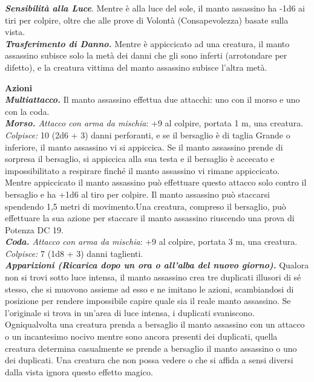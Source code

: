 \begin{multicols}{2}
\emph{\textbf{Sensibilità alla Luce}}. Mentre è alla luce del sole, il manto assassino ha -1d6 ai tiri per colpire, oltre che alle prove di Volontà (Consapevolezza) basate sulla vista.\\

\emph{\textbf{Trasferimento di Danno.}} Mentre è appiccicato ad una creatura, il manto assassino subisce solo la metà dei danni che gli sono inferti (arrotondare per difetto), e la creatura vittima del manto assassino subisce l'altra metà.

\smallskip\textbf{Azioni}\\

\emph{\textbf{Multiattacco.}} Il manto assassino effettua due attacchi: uno con il morso e uno con la coda.\\

\emph{\textbf{Morso.} Attacco con arma da mischia}: +9 al colpire, portata 1 m, una creatura.\\

\emph{Colpisce:} 10 (2d6 + 3) danni perforanti, e se il bersaglio è di taglia Grande o inferiore, il manto assassino vi si appiccica. Se il manto assassino prende di sorpresa il bersaglio, si appiccica alla sua testa e il bersaglio è accecato e impossibilitato a respirare finché il manto assassino vi rimane appiccicato.\\
Mentre appiccicato il manto assassino può effettuare questo attacco solo  contro il bersaglio e ha +1d6 al tiro per colpire. Il manto assassino può staccarsi spendendo 1,5 metri di movimento.Una creatura, compreso il bersaglio, può effettuare la sua azione per  staccare il  manto assassino riuscendo una prova di Potenza DC  19.\\

\emph{\textbf{Coda.} Attacco con arma da mischia}: +9 al colpire, portata 3 m, una creatura.\\
\emph{Colpisce:} 7 (1d8 + 3) danni taglienti.\\

\emph{\textbf{Apparizioni (Ricarica dopo un ora o all'alba del nuovo giorno).}} Qualora non si trovi sotto luce intensa, il manto assassino crea tre duplicati illusori di sé stesso, che si muovono assieme ad esso e ne imitano le azioni, scambiandosi di posizione per rendere impossibile capire quale sia il reale manto assassino. Se l'originale si trova in un'area di luce intensa, i duplicati svaniscono. \\
Ogniqualvolta una creatura prenda a bersaglio il manto assassino con un attacco o un incantesimo nocivo mentre sono ancora presenti dei duplicati, quella creatura determina casualmente se prende a bersaglio il manto assassino o uno dei duplicati. Una creatura che non possa vedere o che si affida a sensi diversi dalla vista ignora questo effetto magico.\\


\end{multicols}

